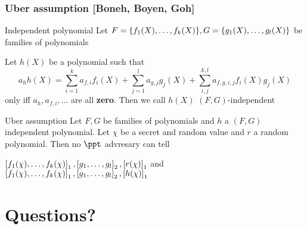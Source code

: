 \documentclass[aspectratio=169]{beamer}
\renewcommand{\emph}[1]{\textbf{#1}}
\begin{document}
\begin{frame}
  \frametitle{Uber assumption [Boneh, Boyen, Goh]}
  \begin{block}{Independent polynomial}
    Let $F = \{f_1(X), \ldots, f_k(X)\}, G = \{g_1(X), \ldots, g_l(X)\}$ be
    families of polynomials

    Let $h(X)$ be a polynomial such that
    \[
      a_h h(X) = \sum_{i = 1}^k a_{f, i} f_i (X) + \sum_{j = 1}^l a_{g, j} g_j
      (X) + \sum_{i, j}^{k, l} a_{f, g, i, j} f_i (X) g_j (X) 
    \]
    only iff $a_h, a_{f, i}, \ldots $ are all \emph{zero}. Then we call $h(X)$
    $(F, G)$-independent
  \end{block}\pause

  \begin{block}{Uber assumption}
    Let $F, G$ be families of polynomials and $h$ a $(F, G)$ independent
    polynomial. Let $\chi$ be a secret and random value and $r$ a random
    polynomial. Then no $\ppt$
    advresary can tell
    \begin{center}
     $\left[f_1(\chi), \ldots, f_k(\chi)\right]_{1}, \left[g_1, \ldots, g_l\right]_{2},
     \left[r(\chi)\right]_{1}$ and 
     $\left[f_1(\chi), \ldots, f_k(\chi)\right]_{1}, \left[g_1, \ldots, g_l\right]_{2},
     \left[h(\chi)\right]_{1}$
     \end{center}
    \end{block}
\end{frame}

\section{Questions?}
\end{document}
